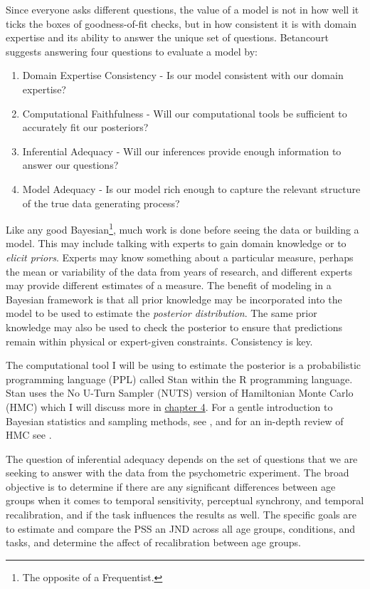 \documentclass[11pt, oneside, openany]{scrbook}
\providecommand{\tightlist}{%
  \setlength{\itemsep}{0pt}\setlength{\parskip}{0pt}}
\begin{document}
Since everyone asks different questions, the value of a model is not in how well it ticks the boxes of goodness-of-fit checks, but in how consistent it is with domain expertise and its ability to answer the unique set of questions. Betancourt suggests answering four questions to evaluate a model by:


\begin{enumerate}
\def\labelenumi{\arabic{enumi}.}
\tightlist
\item
  Domain Expertise Consistency - Is our model consistent with our domain expertise?
\item
  Computational Faithfulness - Will our computational tools be sufficient to accurately fit our posteriors?
\item
  Inferential Adequacy - Will our inferences provide enough information to answer our questions?
\item
  Model Adequacy - Is our model rich enough to capture the relevant structure of the true data generating process?
\end{enumerate}


Like any good Bayesian\footnote{The opposite of a Frequentist.}, much work is done before seeing the data or building a model. This may include talking with experts to gain domain knowledge or to \emph{elicit priors}. Experts may know something about a particular measure, perhaps the mean or variability of the data from years of research, and different experts may provide different estimates of a measure. The benefit of modeling in a Bayesian framework is that all prior knowledge may be incorporated into the model to be used to estimate the \emph{posterior distribution}. The same prior knowledge may also be used to check the posterior to ensure that predictions remain within physical or expert-given constraints. Consistency is key.

The computational tool I will be using to estimate the posterior is a probabilistic programming language (PPL) called Stan \citep{R-rstan} within the R programming language. Stan uses the No U-Turn Sampler (NUTS) version of Hamiltonian Monte Carlo (HMC) which I will discuss more in \protect\hyperlink{model-checking}{chapter 4}. For a gentle introduction to Bayesian statistics and sampling methods, see \citet{bolstad2016introduction}, and for an in-depth review of HMC see \citet{betancourt2017conceptual}.

The question of inferential adequacy depends on the set of questions that we are seeking to answer with the data from the psychometric experiment. The broad objective is to determine if there are any significant differences between age groups when it comes to temporal sensitivity, perceptual synchrony, and temporal recalibration, and if the task influences the results as well. The specific goals are to estimate and compare the PSS an JND across all age groups, conditions, and tasks, and determine the affect of recalibration between age groups.
\end{document}
